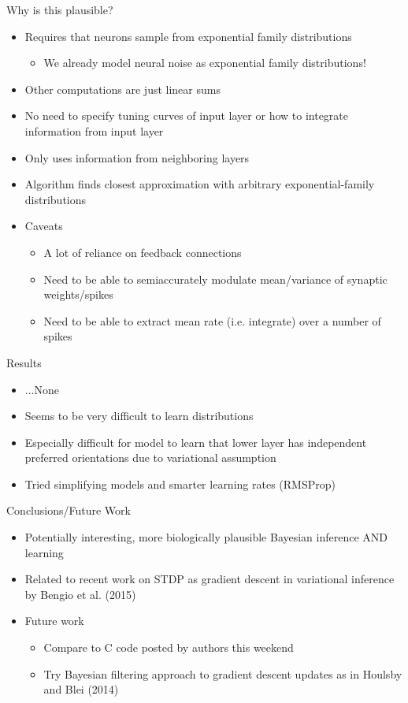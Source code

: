 \documentclass{beamer}
\begin{document}
\begin{frame}{Why is this plausible?}
  \begin{itemize}
  \item
  	Requires that neurons sample from exponential family distributions
	\begin{itemize}
  	\item
  		We already model neural noise as exponential family distributions!
	\end{itemize}
  \item
  	Other computations are just linear sums
  \item
  	No need to specify tuning curves of input layer or how to integrate information from input layer
  \item
  	Only uses information from neighboring layers
  \item
  	Algorithm finds closest approximation with arbitrary exponential-family distributions
  \item
  	Caveats
	 \begin{itemize}
	 \item
	 	A lot of reliance on feedback connections
	\item
		Need to be able to semiaccurately modulate mean/variance of synaptic weights/spikes
	\item
		Need to be able to extract mean rate (i.e. integrate) over a number of spikes
  \end{itemize}
  \end{itemize}
\end{frame}

\begin{frame}{Results}
  \begin{itemize}
  \item
  	...None
  \item
  	Seems to be very difficult to learn distributions
  \item
  	Especially difficult for model to learn that lower layer has independent preferred orientations due to variational assumption
  \item
  	Tried simplifying models and smarter learning rates (RMSProp)
  \end{itemize}
\end{frame}

\begin{frame}{Conclusions/Future Work}
  \begin{itemize}
  \item
  	Potentially interesting, more biologically plausible Bayesian inference AND learning
  \item
  	Related to recent work on STDP as gradient descent in variational inference by Bengio et al. (2015)
  \item
  	Future work
  	\begin{itemize}
  	\item
  		Compare to C code posted by authors this weekend
	\item
		Try Bayesian filtering approach to gradient descent updates as in Houlsby and Blei (2014)
	 \end{itemize}	
  \end{itemize}
\end{frame}
\end{document}
